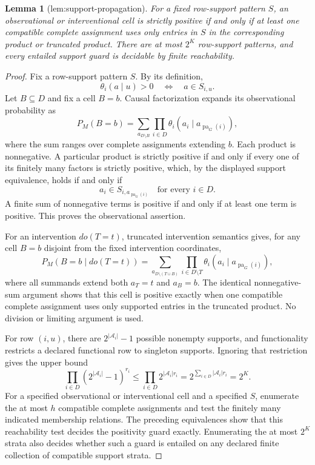 \documentclass{article}
\newtheorem{lemma}{Lemma}
\begin{document}
\begin{lemma}[lem:support-propagation]\label{lem:support-propagation}
For a fixed row-support pattern \(S\), an observational or interventional cell is strictly positive if and only if at least one compatible complete assignment uses only entries in \(S\) in the corresponding product or truncated product. There are at most \(2^K\) row-support patterns, and every entailed support guard is decidable by finite reachability.
\end{lemma}
\begin{proof}
Fix a row-support pattern \(S\).  By its definition,
\[
 \theta_i(a\mid u)>0
 \quad\Longleftrightarrow\quad
 a\in S_{i,u}.
\]
Let \(B\subseteq D\) and fix a cell \(B=b\).  Causal factorization expands its observational probability as
\[
 P_M(B=b)
 =\sum_{a_{D\setminus B}}
   \prod_{i\in D}
   \theta_i(a_i\mid a_{\operatorname{pa}_G(i)}),
\]
where the sum ranges over complete assignments extending \(b\).  Each product is nonnegative.  A particular product is strictly positive if and only if every one of its finitely many factors is strictly positive, which, by the displayed support equivalence, holds if and only if
\[
 a_i\in S_{i,a_{\operatorname{pa}_G(i)}}
 \quad\text{for every }i\in D.
\]
A finite sum of nonnegative terms is positive if and only if at least one term is positive.  This proves the observational assertion.

For an intervention \(do(T=t)\), truncated intervention semantics gives, for any cell \(B=b\) disjoint from the fixed intervention coordinates,
\[
 P_M(B=b\mid do(T=t))
 =\sum_{a_{D\setminus(T\cup B)}}
   \prod_{i\in D\setminus T}
   \theta_i(a_i\mid a_{\operatorname{pa}_G(i)}),
\]
where all summands extend both \(a_T=t\) and \(a_B=b\).  The identical nonnegative-sum argument shows that this cell is positive exactly when one compatible complete assignment uses only supported entries in the truncated product.  No division or limiting argument is used.

For row \((i,u)\), there are \(2^{|\mathcal A_i|}-1\) possible nonempty supports, and functionality restricts a declared functional row to singleton supports.  Ignoring that restriction gives the upper bound
\[
 \prod_{i\in D}
 \left(2^{|\mathcal A_i|}-1\right)^{r_i}
 \le
 \prod_{i\in D}2^{|\mathcal A_i|r_i}
 =2^{\sum_{i\in D}|\mathcal A_i|r_i}
 =2^K.
\]
For a specified observational or interventional cell and a specified \(S\), enumerate the at most \(h\) compatible complete assignments and test the finitely many indicated membership relations.  The preceding equivalences show that this reachability test decides the positivity guard exactly.  Enumerating the at most \(2^K\) strata also decides whether such a guard is entailed on any declared finite collection of compatible support strata.
\end{proof}
\end{document}
